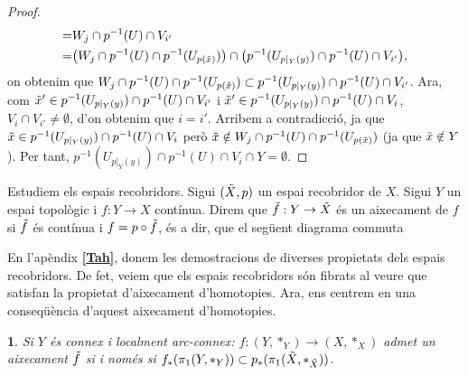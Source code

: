 \documentclass[compress,10pt]{article}
\newtheorem{enunciat}{}
\theoremstyle{definition}
\begin{document}
\begin{proof}
\begin{equation}
\begin{split}
        =&W_{j}\cap p^{-1}(U)\cap V_{i'}\\
        =&\big(W_{j}\cap p^{-1}(U)\cap p^{-1}(U_{p(\Tilde{x})})\big)\cap\big(p^{-1}(U_{p|_{Y}(y)})\cap p^{-1}(U)\cap V_{i'}\big),
    \end{split}
    \end{equation}
    on obtenim que $W_{j}\cap p^{-1}(U)\cap p^{-1}(U_{p(\Tilde{x})})\subset p^{-1}(U_{p|_{Y}(y)})\cap p^{-1}(U)\cap V_{i'}$. Ara, com $\Tilde{x}'\in p^{-1}(U_{p|_{Y}(y)})\cap p^{-1}(U)\cap V_{i'}$ i $\Tilde{x}'\in p^{-1}(U_{p|_{Y}(y)})\cap p^{-1}(U)\cap V_{i}$, $V_{i}\cap V_{i'}\neq\emptyset$, d'on obtenim que $i=i'$. Arribem a contradicció, ja que $\Tilde{x}\in p^{-1}(U_{p|_{Y}(y)})\cap p^{-1}(U)\cap V_{i}$ però $\Tilde{x}\notin W_{j}\cap p^{-1}(U)\cap p^{-1}(U_{p(\Tilde{x})})$ (ja que $\Tilde{x}\notin Y$). Per tant, $p^{-1}(U_{p|_{Y}(y)})\cap p^{-1}(U)\cap V_{i}\cap Y=\emptyset$.
\end{proof}
Estudiem els espais recobridors. Sigui $(\Tilde{X},p)$ un espai recobridor de $X$. Sigui $Y$ un espai topològic i $f:Y\rightarrow X$ contínua. Direm que $\Tilde{f}:Y\rightarrow\Tilde{X}$ és un aixecament de $f$ si $\Tilde{f}$ és contínua i $f=p\circ\Tilde{f}$, és a dir, que el següent diagrama commuta
\begin{center}
\end{center}
En l'apèndix \textbf{\ref{Tah}}, donem les demostracions de diverses propietats dels espais recobridors. De fet, veiem que els espais recobridors són fibrats al veure que satisfan la propietat d'aixecament d'homotopies. Ara, ens centrem en una conseqüència d'aquest aixecament d'homotopies.
\begin{enunciat}
    Si $Y$ és connex i localment arc-connex: $f:(Y,*_{Y})\rightarrow(X,*_{X})$ admet un aixecament $\Tilde{f}$ si i només si $f_{*}(\pi_{1}(Y,*_{Y}))\subset p_{*}(\pi_{1}(\Tilde{X},*_{\Tilde{X}}))$.
\end{enunciat}
\end{document}
